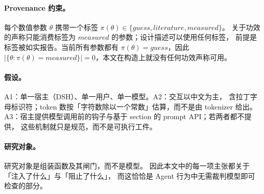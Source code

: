 \paragraph{Provenance 约束。} 每个数值参数 $\theta$ 携带一个标签
$\pi(\theta) \in \{\mathit{guess}, \mathit{literature}, \mathit{measured}\}$。
关于功效的声称只能消费标签为 $\mathit{measured}$ 的参数；设计描述可以使用任何标签，
前提是标签被如实报告。当前所有参数都有 $\pi(\theta) = \mathit{guess}$，因此
$|\{\theta : \pi(\theta) = \mathit{measured}\}| = 0$，本文在构造上就没有任何功效声称可用。

\paragraph{假设。} A1：单一宿主（DSH）、单一用户、单一模型。A2：交互以中文为主，
含拉丁字母标识符；token 数按「字符数除以一个常数」估算，而不是由 tokenizer 给出。
A3：宿主提供模型调用前的钩子与基于 section 的 prompt API；若两者都不提供，
这些机制就只是规范，而不是可执行工件。

\paragraph{研究对象。} 研究对象是组装函数及其闸门，而不是模型。
因此本文中的每一项主张都关于「注入了什么」与「阻止了什么」，
而这恰恰是 Agent 行为中无需裁判模型即可检查的部分。
